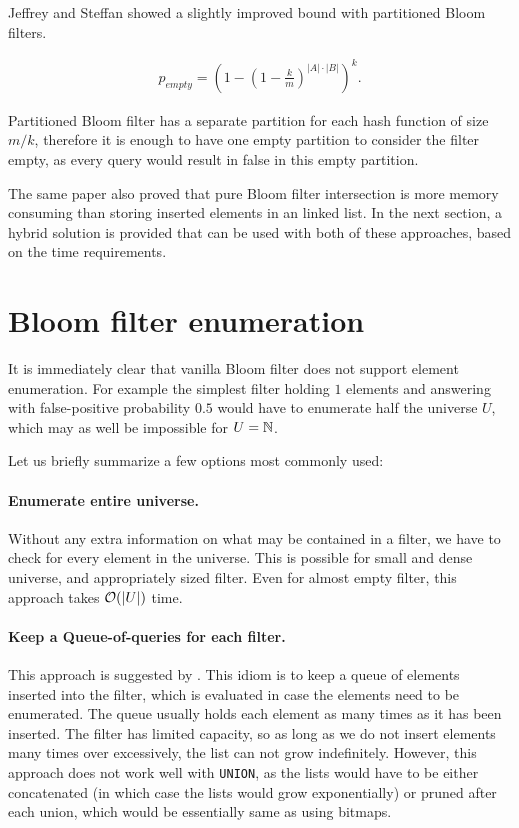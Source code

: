 Jeffrey and Steffan \cite{Jeffrey2011} showed a slightly improved bound with
partitioned Bloom filters.

\begin{align*}
	p_{empty} = \left(1 - \left( 1 - \frac{k}{m}\right)^{|A|\cdot |B|}\right)^k \mathrm{.}
\end{align*}

Partitioned Bloom filter has a separate partition for each hash function of size
$m/k$, therefore it is enough to have one empty partition to consider the filter
empty, as every query would result in false in this empty partition.

The same paper also proved that pure Bloom filter intersection is more
memory consuming than storing inserted elements in an linked list. In the next section,
a hybrid solution is provided that can be used with both of these approaches,
based on the time requirements.

\section{Bloom filter enumeration}

It is immediately clear that vanilla Bloom filter does not support element
enumeration. For example the simplest filter holding $1$ elements and
answering with false-positive probability $0.5$ would have to enumerate half the
universe $U$, which may as well be impossible for $U=\mathbb{N}$.

Let us briefly summarize a few options most commonly used:

\paragraph{Enumerate entire universe.} Without any extra information on what
may be contained in a filter, we have to check for every element in the
universe. This is possible for small and dense universe, and appropriately sized filter.
Even for almost empty filter, this approach takes $\mathcal{O}(|U|)$ time.

\paragraph{Keep a Queue-of-queries for each filter.} This approach is suggested
by \cite{Jeffrey2011}. This idiom is to keep a queue of elements inserted into the filter,
which is evaluated in case the elements need to be enumerated. The queue usually
holds each element as many times as it has been inserted. The filter has
limited capacity, so as long as we do not insert elements many times over
excessively, the list can not grow indefinitely. However, this approach does not
work well with {\tt UNION}, as the lists would have to be either concatenated
(in which case the lists would grow exponentially) or pruned after each union,
which would be essentially same as using bitmaps.

